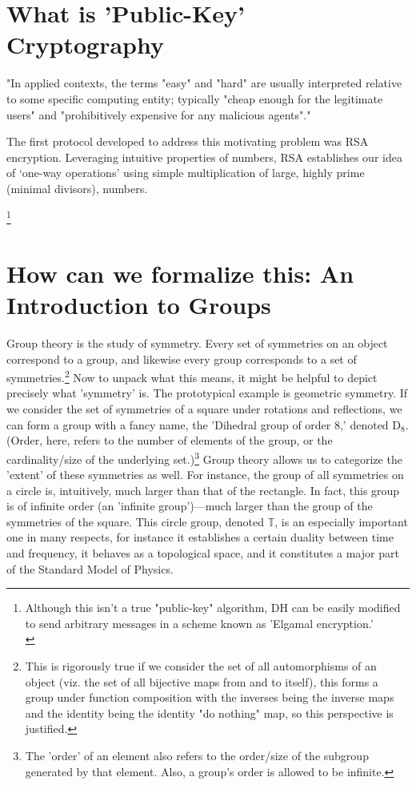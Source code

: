 \documentclass[11pt,a4paper]{article}
\begin{document}
\section{What is 'Public-Key' Cryptography}
"In applied contexts, the terms "easy" and "hard" are usually interpreted relative to some specific computing entity; typically "cheap enough for the legitimate users" and "prohibitively expensive for any malicious agents"."

The first protocol developed to address this motivating problem was RSA encryption. Leveraging intuitive properties of numbers, RSA establishes our idea of ‘one-way operations’ using simple multiplication of large, highly prime (minimal divisors), numbers. 

\footnote{Although this isn't a true "public-key" algorithm, DH can be easily modified to send arbitrary messages in a scheme known as 'Elgamal encryption.'\\\autocite{elgamal}}

\section{How can we formalize this: An Introduction to Groups}
Group theory is the study of symmetry. Every set of symmetries on an object correspond to a group, and likewise every group corresponds to a set of symmetries.\footnote[2]{This is rigorously true if we consider the set of all automorphisms of an object (viz. the set of all bijective maps from and to itself), this forms a group under function composition with the inverses being the inverse maps and the identity being the identity "do nothing" map, so this perspective is justified.} %
Now to unpack what this means, it might be helpful to depict precisely what 'symmetry' is. The prototypical example is geometric symmetry. If we consider the set of symmetries of a square under rotations and reflections, we can form a group with a fancy name, the 'Dihedral group of order 8,' denoted $\mathrm{D}_8$. %
(Order, here, refers to the number of elements of the group, or the cardinality/size of the underlying set.)\footnote[2]{The 'order' of an element also refers to the order/size of the subgroup generated by that element. Also, a group's order is allowed to be infinite.}
Group theory allows us to categorize the 'extent' of these symmetries as well. For instance, the group of all symmetries on a circle is, intuitively, much larger than that of the rectangle. In fact, this group is of infinite order (an 'infinite group')—much larger than the group of the symmetries of the square. This circle group, denoted $\mathbb{T}$, is an especially important one in many respects, for instance it establishes a certain duality between time and frequency, it behaves as a topological space, and it constitutes a major part of the Standard Model of Physics.
\end{document}
